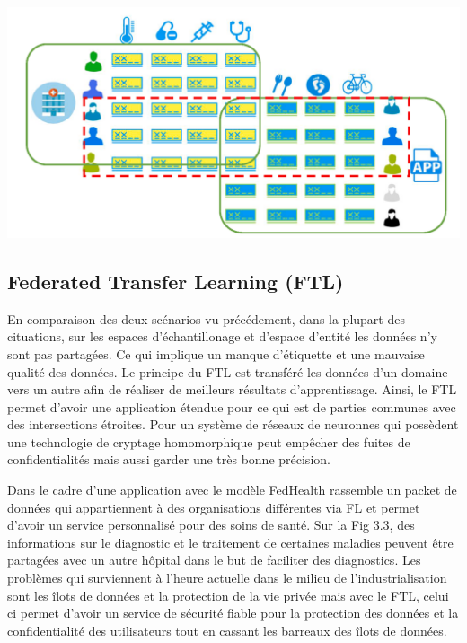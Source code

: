 \documentclass[12pt,a4paper]{report}
\begin{document}
\begin{center}
	\includegraphics[scale=0.2]{fl_vertical}
	\label{fig1}
\end{center}
\pagebreak

\subsection{Federated Transfer Learning (FTL)}

En comparaison des deux scénarios vu précédement, dans la plupart des cituations, sur les espaces d'échantillonage et d'espace d'entité les données n'y sont pas partagées. Ce qui implique un manque d'étiquette et une mauvaise qualité des données. Le principe du FTL est transféré les données d'un domaine vers un autre afin de réaliser de meilleurs résultats d'apprentissage. Ainsi, le FTL permet d'avoir une application étendue pour ce qui est de parties communes avec des intersections étroites. Pour un système de réseaux de neuronnes qui possèdent une technologie de cryptage homomorphique peut empêcher des fuites de confidentialités mais aussi garder une très bonne précision. 

Dans le cadre d'une application avec le modèle FedHealth rassemble un packet de données qui appartiennent à des organisations différentes via FL et permet d'avoir un service personnalisé pour des soins de santé. Sur la Fig 3.3, des informations sur le diagnostic et le traitement de certaines maladies peuvent être partagées avec un autre hôpital dans le but de faciliter des diagnostics. Les problèmes qui surviennent à l'heure actuelle dans le milieu de l'industrialisation sont les îlots de données et la protection de la vie privée mais avec le FTL, celui ci permet d'avoir un service de sécurité fiable pour la protection des données et la confidentialité des utilisateurs tout en cassant les barreaux des îlots de données.
\end{document}

